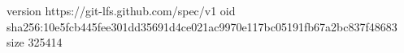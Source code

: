 version https://git-lfs.github.com/spec/v1
oid sha256:10e5fcb445fee301dd35691d4ce021ac9970e117bc05191fb67a2bc837f48683
size 325414
